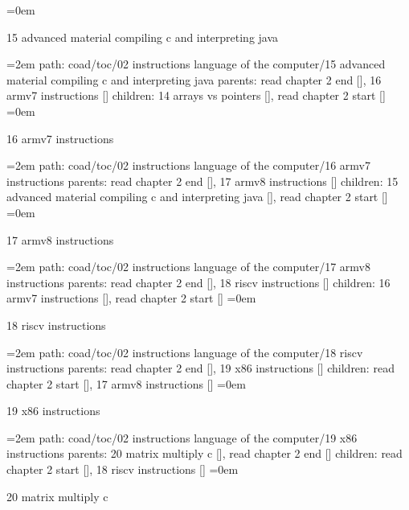 \smallskip
\leftskip=0em
\par\endgroup
\bigskip
{}
15 advanced material compiling c and interpreting java
\smallskip
\par\begingroup
\leftskip=2em
path: coad/toc/02 instructions language of the computer/15 advanced material compiling c and interpreting java
\smallskip
parents:  read chapter 2 end [], 16 armv7 instructions []
\smallskip
children: 14 arrays vs pointers [], read chapter 2 start []
\smallskip
\leftskip=0em
\par\endgroup
\bigskip
{}
16 armv7 instructions
\smallskip
\par\begingroup
\leftskip=2em
path: coad/toc/02 instructions language of the computer/16 armv7 instructions
\smallskip
parents:  read chapter 2 end [], 17 armv8 instructions []
\smallskip
children: 15 advanced material compiling c and interpreting java [], read chapter 2 start []
\smallskip
\leftskip=0em
\par\endgroup
\bigskip
{}
17 armv8 instructions
\smallskip
\par\begingroup
\leftskip=2em
path: coad/toc/02 instructions language of the computer/17 armv8 instructions
\smallskip
parents:  read chapter 2 end [], 18 riscv instructions []
\smallskip
children: 16 armv7 instructions [], read chapter 2 start []
\smallskip
\leftskip=0em
\par\endgroup
\bigskip
{}
18 riscv instructions
\smallskip
\par\begingroup
\leftskip=2em
path: coad/toc/02 instructions language of the computer/18 riscv instructions
\smallskip
parents:  read chapter 2 end [], 19 x86 instructions []
\smallskip
children: read chapter 2 start [], 17 armv8 instructions []
\smallskip
\leftskip=0em
\par\endgroup
\bigskip
{}
19 x86 instructions
\smallskip
\par\begingroup
\leftskip=2em
path: coad/toc/02 instructions language of the computer/19 x86 instructions
\smallskip
parents:  20 matrix multiply c [], read chapter 2 end []
\smallskip
children: read chapter 2 start [], 18 riscv instructions []
\smallskip
\leftskip=0em
\par\endgroup
\bigskip
{}
20 matrix multiply c
\smallskip
\par\begingroup
